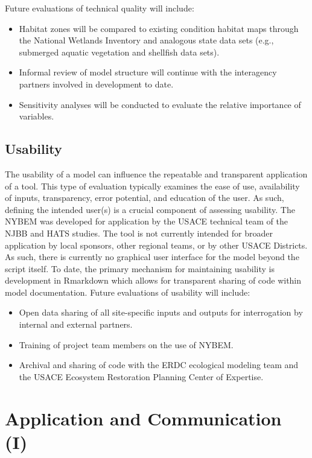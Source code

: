 \documentclass[
]{book}
\begin{document}
Future evaluations of technical quality will include:

\begin{itemize}
\item
  Habitat zones will be compared to existing condition habitat maps through the National Wetlands Inventory and analogous state data sets (e.g., submerged aquatic vegetation and shellfish data sets).
\item
  Informal review of model structure will continue with the interagency partners involved in development to date.
\item
  Sensitivity analyses will be conducted to evaluate the relative importance of variables.
\end{itemize}

\hypertarget{usability}{%
\section{Usability}\label{usability}}

The usability of a model can influence the repeatable and transparent application of a tool. This type of evaluation typically examines the ease of use, availability of inputs, transparency, error potential, and education of the user. As such, defining the intended user(s) is a crucial component of assessing usability. The NYBEM was developed for application by the USACE technical team of the NJBB and HATS studies. The tool is not currently intended for broader application by local sponsors, other regional teams, or by other USACE Districts. As such, there is currently no graphical user interface for the model beyond the script itself. To date, the primary mechanism for maintaining usability is development in Rmarkdown which allows for transparent sharing of code within model documentation.
Future evaluations of usability will include:

\begin{itemize}
\item
  Open data sharing of all site-specific inputs and outputs for interrogation by internal and external partners.
\item
  Training of project team members on the use of NYBEM.
\item
  Archival and sharing of code with the ERDC ecological modeling team and the USACE Ecosystem Restoration Planning Center of Expertise.
\end{itemize}

\hypertarget{application-and-communication-i}{%
\chapter{Application and Communication (I)}\label{application-and-communication-i}}
\end{document}
